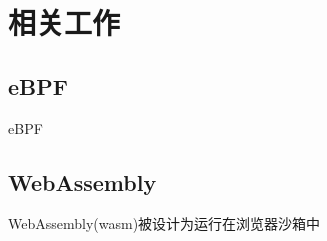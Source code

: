 
\section{相关工作}
\label{section:relatedWork}
\subsection{eBPF}
eBPF
\subsection{WebAssembly}
WebAssembly(wasm)被设计为运行在浏览器沙箱中\cite{WebAssemblySummaryOnSecurity, WasmbpfStreamliningEBPF2024}